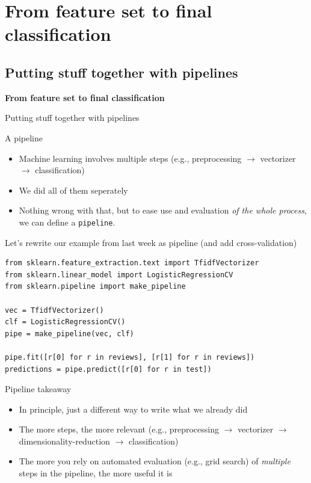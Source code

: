 \documentclass{beamer}
\begin{document}
\section{From feature set to final classification}

\subsection{Putting stuff together with pipelines}
\begin{frame}[plain]
\textbf{From feature set to final classification}

Putting stuff together with pipelines
\end{frame}

\begin{frame}{A pipeline}
\begin{itemize}
	\item Machine learning involves multiple steps (e.g., preprocessing $\rightarrow$ vectorizer $\rightarrow$ classification)
	\item We did all of them seperately
	\item Nothing wrong with that, but to ease use and evaluation \emph{of the whole process}, we can define a \texttt{pipeline}.
\end{itemize}

\end{frame}

\begin{frame}[fragile]{Let's rewrite our example from last week as pipeline (and add cross-validation)}
\begin{lstlisting}
from sklearn.feature_extraction.text import TfidfVectorizer
from sklearn.linear_model import LogisticRegressionCV
from sklearn.pipeline import make_pipeline

vec = TfidfVectorizer()
clf = LogisticRegressionCV()
pipe = make_pipeline(vec, clf)

pipe.fit([r[0] for r in reviews], [r[1] for r in reviews])
predictions = pipe.predict([r[0] for r in test])
\end{lstlisting}
\end{frame}

\begin{frame}{Pipeline takeaway}
\begin{itemize}
	\item In principle, just a different way to write what we already did
	\item The more steps, the more relevant (e.g., preprocessing $\rightarrow$ vectorizer $\rightarrow$ dimensionality-reduction $\rightarrow$ classification)
	\item The more you rely on automated evaluation (e.g., grid search) of \emph{multiple} steps in the pipeline, the more useful it is
\end{itemize}
\end{frame}
\end{document}
